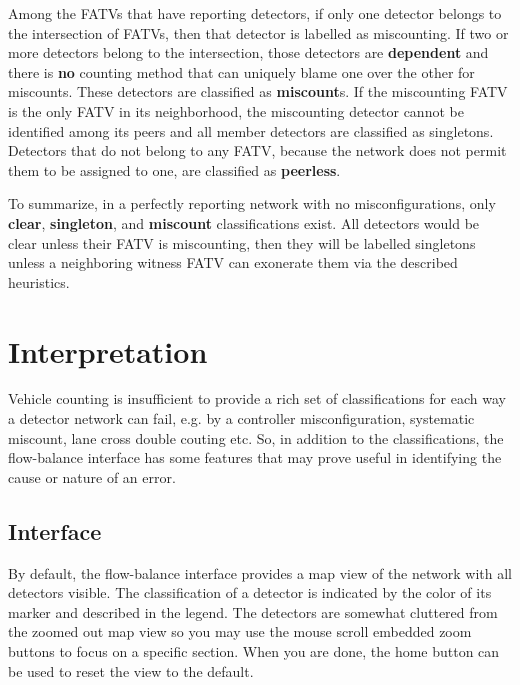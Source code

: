 \documentclass[titlepage]{article}
\begin{document}
Among the FATVs that have reporting detectors, if only one detector belongs to the intersection of FATVs, then that detector is labelled as miscounting. If two or more detectors belong to the intersection, those detectors are \textbf{dependent} and there is \textbf{no} counting method that can uniquely blame one over the other for miscounts. These detectors are classified as \textbf{miscount}s. If the miscounting FATV is the only FATV in its neighborhood, the miscounting detector cannot be identified among its peers and all member detectors are classified as singletons. Detectors that do not belong to any FATV, because the network does not permit them to be assigned to one, are classified as \textbf{peerless}.

To summarize, in a perfectly reporting network with no misconfigurations, only \textbf{clear}, \textbf{singleton}, and \textbf{miscount} classifications exist. All detectors would be clear unless their FATV is miscounting, then they will be labelled singletons unless a neighboring witness FATV can exonerate them via the described heuristics.





\section{Interpretation}\label{interpretation}
Vehicle counting is insufficient to provide a rich set of classifications for each way a detector network can fail, e.g. by a controller misconfiguration, systematic miscount, lane cross double couting etc. So, in addition to the classifications, the flow-balance interface has some features that may prove useful in identifying the cause or nature of an error.

\subsection{Interface}\label{interface}
By default, the flow-balance interface provides a map view of the network with all detectors visible. The classification of a detector is indicated by the color of its marker and described in the legend. The detectors are somewhat cluttered from the zoomed out map view so you may use the mouse scroll embedded zoom buttons to focus on a specific section. When you are done, the home button can be used to reset the view to the default.
\end{document}
